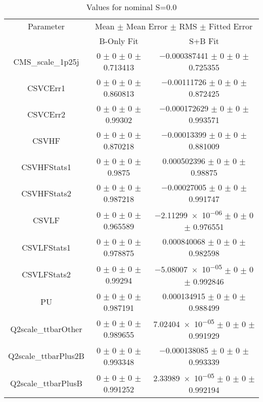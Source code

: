 \begin{table}
\centering
\caption{Values for nominal S=0.0}
\begin{tabular}{ccc}
\toprule
Parameter & \multicolumn{2}{c}{Mean $\pm$ Mean Error $\pm$ RMS $\pm$ Fitted Error}\\
 & B-Only Fit & S+B Fit\\
\midrule
CMS\_scale\_1p25j & \num{0} $\pm$ \num{0} $\pm$ \num{0} $\pm$ \num{0.713413} & \num{-0.000387441} $\pm$ \num{0} $\pm$ \num{0} $\pm$ \num{0.725355}\\
CSVCErr1 & \num{0} $\pm$ \num{0} $\pm$ \num{0} $\pm$ \num{0.860813} & \num{-0.00111726} $\pm$ \num{0} $\pm$ \num{0} $\pm$ \num{0.872425}\\
CSVCErr2 & \num{0} $\pm$ \num{0} $\pm$ \num{0} $\pm$ \num{0.99302} & \num{-0.000172629} $\pm$ \num{0} $\pm$ \num{0} $\pm$ \num{0.993571}\\
CSVHF & \num{0} $\pm$ \num{0} $\pm$ \num{0} $\pm$ \num{0.870218} & \num{-0.00013399} $\pm$ \num{0} $\pm$ \num{0} $\pm$ \num{0.881009}\\
CSVHFStats1 & \num{0} $\pm$ \num{0} $\pm$ \num{0} $\pm$ \num{0.9875} & \num{0.000502396} $\pm$ \num{0} $\pm$ \num{0} $\pm$ \num{0.98875}\\
CSVHFStats2 & \num{0} $\pm$ \num{0} $\pm$ \num{0} $\pm$ \num{0.987218} & \num{-0.00027005} $\pm$ \num{0} $\pm$ \num{0} $\pm$ \num{0.991747}\\
CSVLF & \num{0} $\pm$ \num{0} $\pm$ \num{0} $\pm$ \num{0.965589} & \num{-2.11299e-06} $\pm$ \num{0} $\pm$ \num{0} $\pm$ \num{0.976551}\\
CSVLFStats1 & \num{0} $\pm$ \num{0} $\pm$ \num{0} $\pm$ \num{0.978875} & \num{0.000840068} $\pm$ \num{0} $\pm$ \num{0} $\pm$ \num{0.982598}\\
CSVLFStats2 & \num{0} $\pm$ \num{0} $\pm$ \num{0} $\pm$ \num{0.99294} & \num{-5.08007e-05} $\pm$ \num{0} $\pm$ \num{0} $\pm$ \num{0.992846}\\
PU & \num{0} $\pm$ \num{0} $\pm$ \num{0} $\pm$ \num{0.987191} & \num{0.000134915} $\pm$ \num{0} $\pm$ \num{0} $\pm$ \num{0.988499}\\
Q2scale\_ttbarOther & \num{0} $\pm$ \num{0} $\pm$ \num{0} $\pm$ \num{0.989655} & \num{7.02404e-05} $\pm$ \num{0} $\pm$ \num{0} $\pm$ \num{0.991929}\\
Q2scale\_ttbarPlus2B & \num{0} $\pm$ \num{0} $\pm$ \num{0} $\pm$ \num{0.993348} & \num{-0.000138085} $\pm$ \num{0} $\pm$ \num{0} $\pm$ \num{0.993339}\\
Q2scale\_ttbarPlusB & \num{0} $\pm$ \num{0} $\pm$ \num{0} $\pm$ \num{0.991252} & \num{2.33989e-05} $\pm$ \num{0} $\pm$ \num{0} $\pm$ \num{0.992194}\\

\end{tabular}
\end{table}
